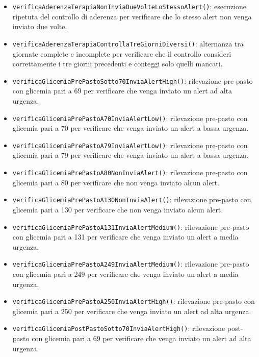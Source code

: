 \begin{itemize}
	\item \texttt{verificaAderenzaTerapiaNonInviaDueVolteLoStessoAlert()}: esecuzione ripetuta del controllo di aderenza per verificare che lo stesso alert non venga inviato due volte.
	
	\item \texttt{verificaAderenzaTerapiaControllaTreGiorniDiversi()}: alternanza tra giornate complete e incomplete per verificare che il controllo consideri correttamente i tre giorni precedenti e conteggi solo quelli mancati.
	
	\item \texttt{verificaGlicemiaPrePastoSotto70InviaAlertHigh()}: rilevazione pre-pasto con glicemia pari a 69 per verificare che venga inviato un alert ad alta urgenza.
	
	\item \texttt{verificaGlicemiaPrePastoA70InviaAlertLow()}: rilevazione pre-pasto con glicemia pari a 70 per verificare che venga inviato un alert a bassa urgenza.
	
	\item \texttt{verificaGlicemiaPrePastoA79InviaAlertLow()}: rilevazione pre-pasto con glicemia pari a 79 per verificare che venga inviato un alert a bassa urgenza.
	
	\item \texttt{verificaGlicemiaPrePastoA80NonInviaAlert()}: rilevazione pre-pasto con glicemia pari a 80 per verificare che non venga inviato alcun alert.
	
	\item \texttt{verificaGlicemiaPrePastoA130NonInviaAlert()}: rilevazione pre-pasto con glicemia pari a 130 per verificare che non venga inviato alcun alert.
	
	\item \texttt{verificaGlicemiaPrePastoA131InviaAlertMedium()}: rilevazione pre-pasto con glicemia pari a 131 per verificare che venga inviato un alert a media urgenza.
	
	\item \texttt{verificaGlicemiaPrePastoA249InviaAlertMedium()}: rilevazione pre-pasto con glicemia pari a 249 per verificare che venga inviato un alert a media urgenza.
	
	\item \texttt{verificaGlicemiaPrePastoA250InviaAlertHigh()}: rilevazione pre-pasto con glicemia pari a 250 per verificare che venga inviato un alert ad alta urgenza.
	
	\item \texttt{verificaGlicemiaPostPastoSotto70InviaAlertHigh()}: rilevazione post-pasto con glicemia pari a 69 per verificare che venga inviato un alert ad alta urgenza.
	

\end{itemize}
